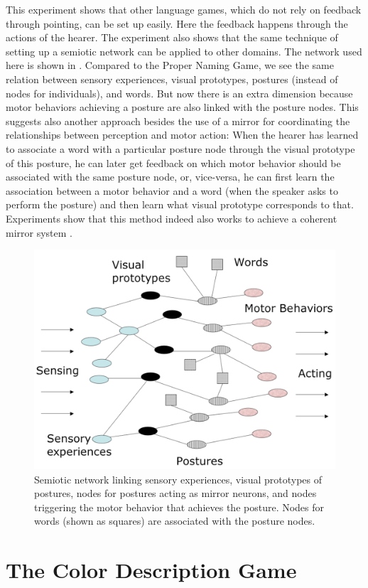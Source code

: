 This experiment shows that other language games, which do not rely on feedback through pointing, can be set up easily. 
Here the feedback happens through the actions of the hearer. The experiment also shows
that the same technique of setting up a semiotic network can be applied to other domains. 
The network used here is shown in . Compared to the Proper Naming Game, we see the same relation between 
sensory experiences, visual prototypes, postures (instead of nodes for individuals), 
and words. But now there is an extra dimension because motor behaviors 
achieving a posture are also linked with the posture nodes. This suggests also another approach besides the use of a mirror 
for coordinating the relationships between perception and motor action: When the hearer has learned to associate a word with a particular
posture node through the visual prototype of this posture, he can later get feedback on which motor behavior should be 
associated with the same posture node, or, vice-versa, he can first learn the association between a motor behavior and 
a word (when the speaker asks to perform the posture) and then learn what visual prototype corresponds to that. 
Experiments show that this method indeed also works to achieve a coherent mirror system \cite{Steels:2008}.

\begin{figure}
\centerline{\includegraphics[width=0.6\linewidth]{chap11/figs/network}}
\caption{ \label{network} Semiotic network linking sensory experiences, visual prototypes of postures, nodes for postures acting as mirror neurons, and nodes triggering the motor behavior that achieves the posture. Nodes for words (shown as squares) 
are associated with the posture nodes.}
\end{figure}

\section{The Color Description Game}

